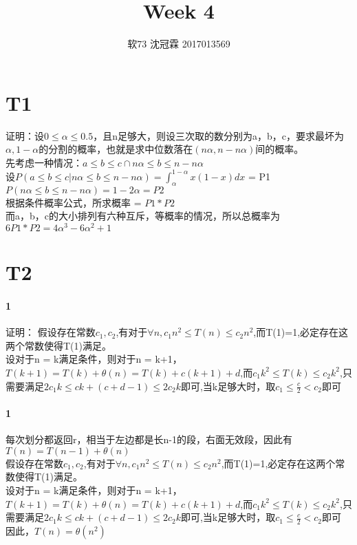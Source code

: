 \documentclass{article}
\title{Week 4}
\author{软73 沈冠霖 2017013569}
\begin{document}
\begin{CJK}{UTF8}{gkai}
\maketitle

\section{T1} 
证明：设$0 \leq \alpha \leq 0.5$，且n足够大，则设三次取的数分别为a，b，c，要求最坏为$\alpha, 1-\alpha$的分割的概率，也就是求中位数落在$(n\alpha,n - n\alpha)$间的概率。\\
先考虑一种情况：$a\leq b \leq c \cap n\alpha \leq b \leq n - n\alpha$\\
设$P(a\leq b \leq c | n\alpha \leq b \leq n - n\alpha) = \int_{\alpha}^{1-\alpha}x(1-x)dx$ = P1\\
$P(n\alpha \leq b \leq n - n\alpha) = 1-2\alpha = P2$\\
根据条件概率公式，所求概率 = $P1*P2$\\
而a，b，c的大小排列有六种互斥，等概率的情况，所以总概率为 $6P1*P2 = 4\alpha^{3}-6\alpha^{2}+1$\\
\section{T2}
\paragraph{1}
证明：
假设存在常数$c_{1},c_{2}$,有对于$\forall n, c_{1}n^{2} \leq T(n) \leq c_{2}n^{2}$,而T(1)=1,必定存在这两个常数使得T(1)满足。\\
设对于n = k满足条件，则对于n = k+1，$T(k+1) = T(k)+\theta(n)=T(k)+c(k+1)+d$,而$c_{1}k^{2} \leq T(k) \leq  c_{2}k^{2}$,只需要满足$2c_{1}k \leq ck+(c+d-1) \leq 2c_{2}k$即可,当k足够大时，取$c_{1} \leq \frac{c}{2} <c_{2}$即可 
\paragraph{1}
每次划分都返回r，相当于左边都是长n-1的段，右面无效段，因此有$T(n) = T(n-1) + \theta(n)$\\
假设存在常数$c_{1},c_{2}$,有对于$\forall n, c_{1}n^{2} \leq T(n) \leq c_{2}n^{2}$,而T(1)=1,必定存在这两个常数使得T(1)满足。\\
设对于n = k满足条件，则对于n = k+1，$T(k+1) = T(k)+\theta(n)=T(k)+c(k+1)+d$,而$c_{1}k^{2} \leq T(k) \leq  c_{2}k^{2}$,只需要满足$2c_{1}k \leq ck+(c+d-1) \leq 2c_{2}k$即可,当k足够大时，取$c_{1} \leq \frac{c}{2} <c_{2}$即可\\
因此，$T(n) = \theta(n^{2})$

\end{CJK}
\end{document}
